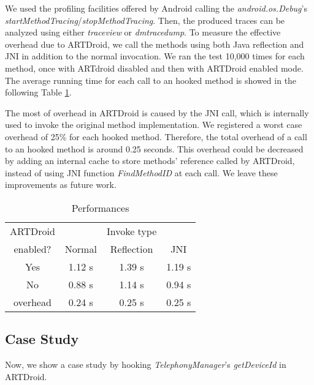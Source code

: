 We used the profiling facilities offered by Android calling the \textit{android.os.Debug}'s \textit{startMethodTracing}/\textit{stopMethodTracing}. Then, the produced traces can be analyzed using either \textit{traceview} or \textit{dmtracedump}. To measure the effective overhead due to ARTDroid, we call the methods using both Java reflection and JNI in addition to the normal invocation. We ran the test 10,000 times for each method, once with ARTdroid disabled and then with ARTDroid enabled mode. The average running time for each call to an hooked method is showed in the following Table \ref{t:perf}.

The most of overhead in ARTDroid is caused by the JNI call, which is internally used to invoke the original method implementation. We registered a worst case overhead of 25\% for each hooked method. Therefore, the total overhead of a call to an hooked method is around 0.25 seconds. This overhead could be decreased by adding an internal cache to store methods' reference called by ARTDroid, instead of using JNI function \textit{FindMethodID}  at each call. We leave these improvements as future work. \\

\begin{table}[ht]
\centering
\caption{Performances}

\bigskip

\begin{tabular}{c  c c c }
\toprule
\multicolumn{1}{c}{ARTDroid} & & Invoke type \\
\cmidrule(r){2-4}
enabled? &  Normal & Reflection & JNI \\ 
\midrule
Yes & 1.12 s   &   1.39 s  &   1.19 s  \\ 
No & 0.88 s& 1.14  s & 0.94 s \\ 
\toprule
overhead & 0.24 s    &   0.25 s  &   0.25 s \\
\toprule
\end{tabular}
\label{t:perf}
\end{table}


\subsection{Case Study}
\label{sec:usage}

Now, we show a case study by hooking \textit{TelephonyManager}'s \textit{getDeviceId} in ARTDroid.

%

